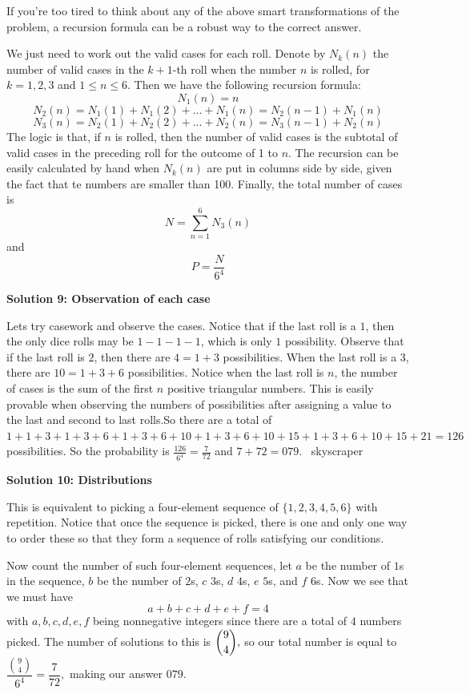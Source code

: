 \begin{enumerate}
If you're too tired to think about any of the above smart transformations of the problem, a recursion formula can be a robust way to the correct answer. 

 We just need to work out the valid cases for each roll. Denote by $N_{k}(n)$ the number of valid cases in the $k+1$-th roll when the number $n$ is rolled, for $k=1,2,3$ and $1 \leq n \leq 6$. Then we have the following recursion formula:
 \[N_{1}(n) = n\]
 \[N_{2}(n) = N_{1}(1) + N_{1}(2) + ... + N_{1}(n)=N_{2}(n-1)+N_{1}(n)\]
 \[N_{3}(n) = N_{2}(1) + N_{2}(2) + ... + N_{2}(n)=N_{3}(n-1)+N_{2}(n)\]The logic is that, if $n$ is rolled, then the number of valid cases is the subtotal of valid cases in the preceding roll for the outcome of 1 to $n$.  The recursion can be easily calculated by hand when $N_k(n)$ are put in columns side by side, given the fact that te numbers are smaller than 100. Finally, the total number of cases is
 \[N = \sum_{n=1}^{6} N_{3}(n)\]and
 \[P = \frac{N}{6^4}\]




\textbf{Solution 9: Observation of each case}

Lets try casework and observe the cases. Notice that if the last roll is a $1$, then the only dice rolls may be $1-1-1-1$, which is only $1$ possibility. Observe that if the last roll is $2$, then there are $4 = 1 + 3$ possibilities. When the last roll is a $3$, there are $10 = 1 + 3 + 6$ possibilities. Notice when the last roll is $n$, the number of cases is the sum of the first $n$ positive triangular numbers. This is easily provable when observing the numbers of possibilities after assigning a value to the last and second to last rolls.So there are a total of $1 + 1 + 3 + 1 + 3 + 6 + 1 + 3 + 6 + 10 + 1 + 3 + 6 + 10 + 15 + 1 + 3 + 6 + 10 + 15 + 21 = 126$ possibilities. So the probability is $\frac{126}{6^4} = \frac{7}{72}$ and $7 + 72 = \boxed{079}$. ~skyscraper

 



\textbf{Solution 10: Distributions}

This is equivalent to picking a four-element sequence of $\{1, 2, 3, 4, 5, 6\}$ with repetition. Notice that once the sequence is picked, there is one and only one way to order these so that they form a sequence of rolls satisfying our conditions. 

 Now count the number of such four-element sequences, let $a$ be the number of $1$s in the sequence, $b$ be the number of $2$s, $c$ $3$s, $d$ $4$s, $e$ $5$s, and $f$ $6$s. Now we see that we must have 
 \[a + b + c + d + e + f = 4\] with $a, b, c, d, e, f$ being nonnegative integers since there are a total of $4$ numbers picked. The number of solutions to this is $\dbinom{9}{4},$ so our total number is equal to $\dfrac{\binom{9}{4}}{6^4} = \dfrac{7}{72},$ making our answer $\boxed{079}.$





\end{enumerate}
